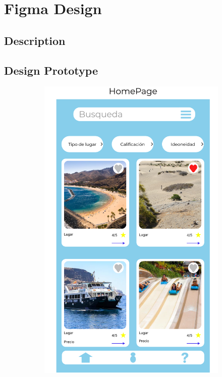 \chapter{Figma Design}

\section{Description}


\section{Design Prototype}

\begin{figure}
	\centering
	\begin{subfigure}[T]{0.4\linewidth}
		\includegraphics[width=\linewidth]{figures/homepage.png}

\end{subfigure}
\end{figure}
